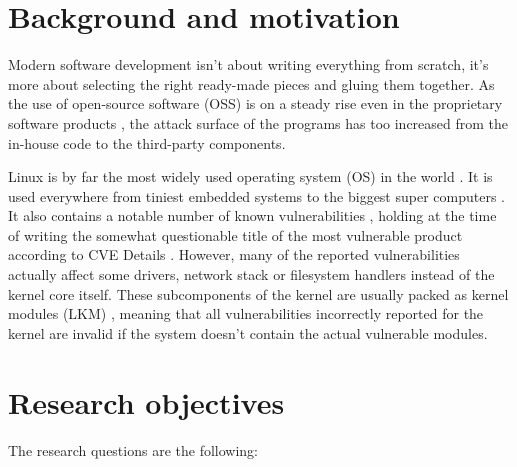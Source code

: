 
\section{Background and motivation}

Modern software development isn't about writing everything from scratch, it's more about selecting
the right ready-made pieces and gluing them together. As the use of open-source software (OSS) is
on a steady rise even in the proprietary software products \cite{deshpande2008total}, the attack
surface of the programs has too increased from the in-house code to the third-party components.

Linux is by far the most widely used operating system (OS) in the world \cite{blah}. It is used
everywhere from tiniest embedded systems \cite{picotux} to the biggest super computers
\cite{top500linuxshare}. It also contains a notable number of known vulnerabilities
\cite{cvedetailslinuxkernel}, holding at the time of writing the somewhat questionable title of the
most vulnerable product according to CVE Details \cite{cvedetailstop50}. However, many of the
reported vulnerabilities actually affect some drivers, network stack or filesystem handlers instead
of the kernel core itself. These subcomponents of the kernel are usually packed as kernel modules
(LKM) \cite{blah}, meaning that all vulnerabilities incorrectly reported for the kernel are invalid
if the system doesn't contain the actual vulnerable modules.

\section{Research objectives}
\label{sect:questions}

The research questions are the following:


